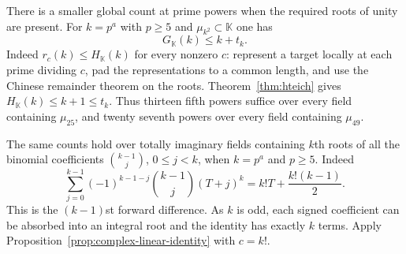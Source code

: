 \documentclass[11pt,letterpaper]{article}
\theoremstyle{definition}
\numberwithin{equation}{section}
\begin{document}
There is a smaller global count at prime powers when the required
roots of unity are present. For $k=p^a$ with $p\ge5$ and
$\mu_{k^2}\subset\mathbb K$ one has
\begin{equation}\label{eq:cyclo-imag-powers}
               G_{\mathbb K}(k)\le k+t_k .
\end{equation}
Indeed $r_c(k)\le H_{\mathbb K}(k)$ for every nonzero $c$:
represent a target locally at each prime dividing $c$, pad the
representations to a common length, and use the Chinese remainder
theorem on the roots. Theorem~\ref{thm:hteich} gives
$H_{\mathbb K}(k)\le k+1\le t_k$. Thus thirteen fifth powers suffice
over every field containing $\mu_{25}$, and twenty seventh powers over
every field containing $\mu_{49}$.

The same counts hold over totally imaginary fields containing
$k$th roots of all the binomial coefficients $\binom{k-1}{j}$,
$0\le j<k$, when $k=p^a$ and $p\ge5$. Indeed
\[
 \sum_{j=0}^{k-1}(-1)^{k-1-j}\binom{k-1}{j}(T+j)^k
                         = k!T+\frac{k!(k-1)}2 .
\]
This is the $(k-1)$st forward difference. As $k$ is odd, each signed
coefficient can be absorbed into an integral root and the identity
has exactly $k$ terms. Apply Proposition~\ref{prop:complex-linear-identity}
with $c=k!$.
\end{document}
